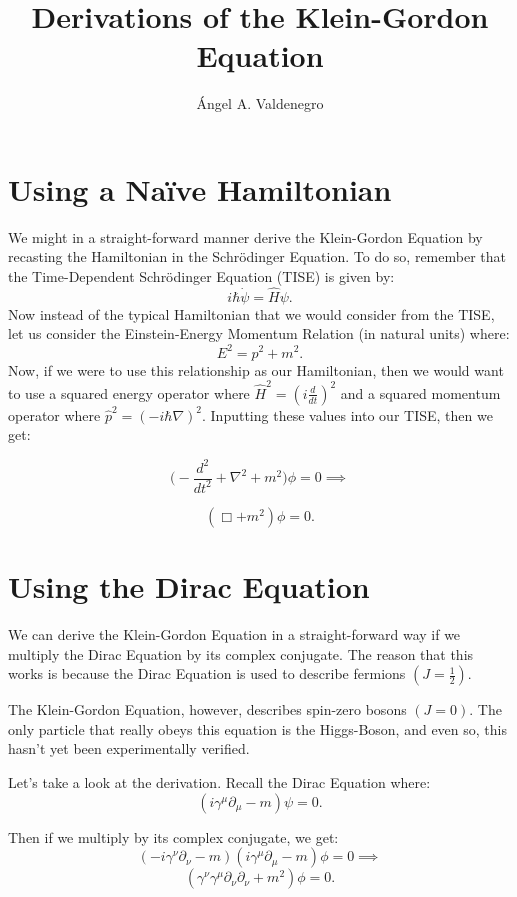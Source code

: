 \documentclass[parskip=full]{article}
\title{Derivations of the Klein-Gordon Equation}
\author{\'{A}ngel A. Valdenegro}
\begin{document}
\maketitle

\section{Using a Na\"{i}ve Hamiltonian}
We might in a straight-forward manner derive the Klein-Gordon Equation by recasting the Hamiltonian in the Schr\"{o}dinger Equation. To do so, remember that the Time-Dependent Schr\"{o}dinger Equation (TISE) is given by:
\[
    i\hbar \dot{\psi} = \hat{H}\psi
.\] 
Now instead of the typical Hamiltonian that we would consider from the TISE, let us consider the Einstein-Energy Momentum Relation (in natural units) where:
\[
    E^2 = p^2 + m^2
.\] 
Now, if we were to use this relationship as our Hamiltonian, then we would want to use a squared energy operator where $\hat{H}^2 = (i\frac{d}{dt})^2$ and a squared momentum operator where $\hat{p}^2 = (-i\hbar \nabla)^2$. Inputting these values into our TISE, then we get:

\[
    \Big(- \frac{d^2}{dt^2} + \nabla^2 + m^2 \Big)\phi = 0 \implies
\] 

\begin{equation}
    (\Box + m^2)\phi = 0.
\end{equation}

\section{Using the Dirac Equation}
We can derive the Klein-Gordon Equation in a straight-forward way if we multiply the Dirac Equation by its complex conjugate. The reason that this works is because the Dirac Equation is used to describe fermions $(J = \frac{1}{2})$.

The Klein-Gordon Equation, however, describes spin-zero bosons $(J = 0)$. The only particle that really obeys this equation is the Higgs-Boson, and even so, this hasn't yet been experimentally verified.

Let's take a look at the derivation. Recall the Dirac Equation where:
\[
    (i\gamma^{\mu} \partial_{\mu} - m)\psi = 0
.\] 

Then if we multiply by its complex conjugate, we get:
\[
    (-i\gamma^{\nu} \partial_{\nu} - m)(i\gamma^{\mu} \partial_{\mu} - m)\phi = 0 \implies
\] 
\[
    (\gamma^{\nu}\gamma^{\mu}\partial_{\nu}\partial_{\nu} + m^2)\phi = 0
.\]
\end{document}
